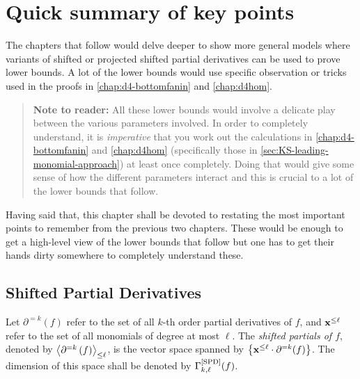 \chapter{Quick summary of key points}
\label{chap:SPD_summary}

The chapters that follow would delve deeper to show more general models where variants of shifted or projected shifted partial derivatives can be used to prove lower bounds.
A lot of the lower bounds would use specific observation or tricks used in the proofs in \autoref{chap:d4-bottomfanin} and \autoref{chap:d4hom}. 

\begin{quote}
\begin{mdframed}
{\bf Note to reader:} All these lower bounds would involve a delicate play between the various parameters involved. In order to completely understand, it is \emph{imperative} that you work out the calculations in \autoref{chap:d4-bottomfanin} and \autoref{chap:d4hom} (specifically those in \autoref{sec:KS-leading-monomial-approach}) at least once completely. Doing that would give some sense of how the different parameters interact and this is crucial to a lot of the lower bounds that follow. 
\end{mdframed}
\end{quote}

Having said that, this chapter shall be devoted to restating the most important points to remember from the previous two chapters.
These would be enough to get a high-level view of the lower bounds that follow but one has to get their hands dirty somewhere to completely understand these.

\section{Shifted Partial Derivatives}

\begin{definition*}
  Let $\partial^{=k}(f)$ refer to the set of all $k$-th order partial derivatives of $f$, and $\mathbf{x}^{\leq \ell}$ refer to the set of all monomials of degree at most $\ell$. 
The \emph{shifted partials of $f$}, denoted by $\left\langle\partial^{=k}\left(f\right)\right\rangle_{\leq \ell}$, is the vector space spanned by $\left\{\mathbf{x}^{\leq \ell} \cdot \partial^{=k}(f)\right\}$. 
The dimension of this space shall be denoted by $\Gamma^{\mathrm{[SPD]}}_{k,\ell}(f)$. 
\end{definition*}

